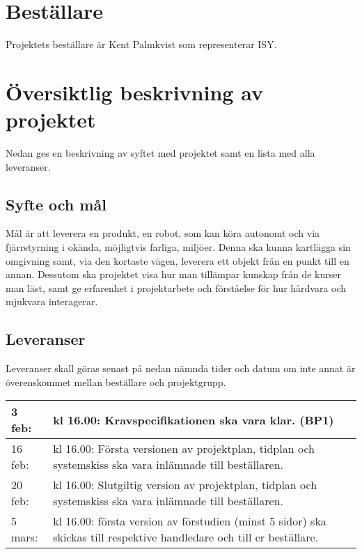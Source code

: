 \documentclass[11pt]{article}
\begin{document}
\begin{flushleft}
\section{Beställare}
Projektets beställare är Kent Palmkvist som representerar ISY.

\section{Översiktlig beskrivning av projektet}
Nedan ges en beskrivning av syftet med projektet samt en lista med alla leveranser.

\subsection{Syfte och mål}
Mål är att leverera en produkt, en robot, som kan köra autonomt och via fjärrstyrning i okända, möjligtvis farliga, miljöer. Denna ska kunna kartlägga sin omgivning samt, via den kortaste vägen, leverera ett objekt från en punkt till en annan. Dessutom ska projektet visa hur man tillämpar kunskap från de kurser man läst, samt ge erfarenhet i projektarbete och förståelse för hur hårdvara och mjukvara interagerar.

\subsection{Leveranser} %
Leveranser skall göras senast på nedan nämnda tider och datum om inte annat är överenskommet mellan beställare och projektgrupp.

\begin{center}
\begin{longtable}{|l |p{.8\linewidth}|} \hline

3 feb: & 
kl 16.00: Kravspecifikationen ska vara klar. (BP1) \\ \hline

16 feb: & 
kl 16.00: Första versionen av projektplan, tidplan och systemskiss ska vara inlämnade till beställaren. \\ \hline

20 feb: & 
kl 16.00: Slutgiltig version av projektplan, tidplan och systemskiss ska vara inlämnade till beställaren. \\ \hline

5 mars: &
kl 16.00: första version av förstudien (minst 5 sidor) ska skickas till respektive handledare och till er beställare. \\ \hline


\end{longtable}
\end{center}
\end{flushleft}
\end{document}
